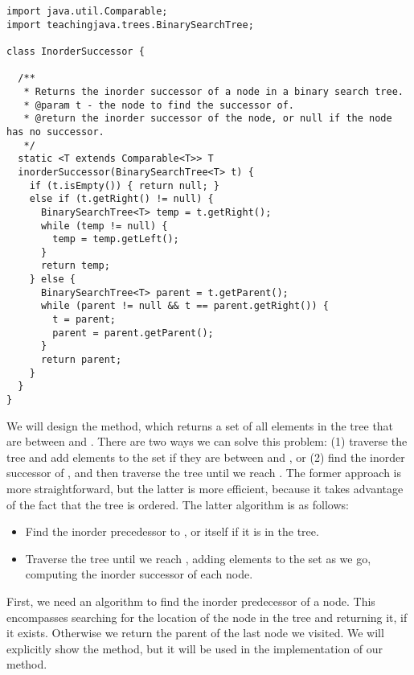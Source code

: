 \begin{lstlisting}[language=MyJava]
import java.util.Comparable;
import teachingjava.trees.BinarySearchTree;

class InorderSuccessor {

  /**
   * Returns the inorder successor of a node in a binary search tree.
   * @param t - the node to find the successor of.
   * @return the inorder successor of the node, or null if the node has no successor.
   */
  static <T extends Comparable<T>> T 
  inorderSuccessor(BinarySearchTree<T> t) {
    if (t.isEmpty()) { return null; } 
    else if (t.getRight() != null) {
      BinarySearchTree<T> temp = t.getRight();
      while (temp != null) {
        temp = temp.getLeft();
      }
      return temp;
    } else {
      BinarySearchTree<T> parent = t.getParent();
      while (parent != null && t == parent.getRight()) {
        t = parent;
        parent = parent.getParent();
      }
      return parent;
    }
  }
}
\end{lstlisting}

We will design the  method, which returns a set of all elements in the tree that are between  and . 
There are two ways we can solve this problem: (1) traverse the tree and add elements to the set if they are between  and , or (2) find the inorder successor of , and then traverse the tree until we reach .
The former approach is more straightforward, but the latter is more efficient, because it takes advantage of the fact that the tree is ordered. 
The latter algorithm is as follows:
\begin{itemize}
  \item Find the inorder precedessor to , or  itself if it is in the tree.
  \item Traverse the tree until we reach , adding elements to the set as we go, computing the inorder successor of each node.
\end{itemize}

First, we need an algorithm to find the inorder predecessor of a node. 
This encompasses searching for the location of the node in the tree and returning it, if it exists. Otherwise we return the parent of the last node we visited. We will explicitly show the  method, but it will be used in the implementation of our  method.

